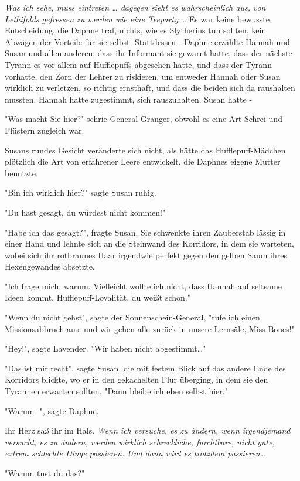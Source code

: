 {\emph{Was ich sehe, muss eintreten … dagegen sieht es wahrscheinlich aus, von Lethifolds gefressen zu werden wie eine Teeparty} … Es war keine bewusste Entscheidung, die Daphne traf, nichts, wie es Slytherins tun sollten, kein Abwägen der Vorteile für sie selbst. Stattdessen - Daphne erzählte Hannah und Susan und allen anderen, dass ihr Informant sie gewarnt hatte, dass der nächste Tyrann es vor allem auf Hufflepuffs abgesehen hatte, und dass der Tyrann vorhatte, den Zorn der Lehrer zu riskieren, um entweder Hannah oder Susan wirklich zu verletzen, so richtig ernsthaft, und dass die beiden sich da raushalten mussten. Hannah hatte zugestimmt, sich rauszuhalten. Susan hatte -

"Was macht Sie hier?" schrie General Granger, obwohl es eine Art Schrei und Flüstern zugleich war.

Susans rundes Gesicht veränderte sich nicht, als hätte das Hufflepuff-Mädchen plötzlich die Art von erfahrener Leere entwickelt, die Daphnes eigene Mutter benutzte.

"Bin ich wirklich hier?" sagte Susan ruhig.

"Du hast gesagt, du würdest nicht kommen!"

"Habe ich das gesagt?", fragte Susan. Sie schwenkte ihren Zauberstab lässig in einer Hand und lehnte sich an die Steinwand des Korridors, in dem sie warteten, wobei sich ihr rotbraunes Haar irgendwie perfekt gegen den gelben Saum ihres Hexengewandes absetzte.

"Ich frage mich, warum. Vielleicht wollte ich nicht, dass Hannah auf seltsame Ideen kommt. Hufflepuff-Loyalität, du weißt schon."

"Wenn du nicht gehst", sagte der Sonnenschein-General, "rufe ich einen Missionsabbruch aus, und wir gehen alle zurück in unsere Lernsäle, Miss Bones!"

"Hey!", sagte Lavender. "Wir haben nicht abgestimmt…"

"Das ist mir recht", sagte Susan, die mit festem Blick auf das andere Ende des Korridors blickte, wo er in den gekachelten Flur überging, in dem sie den Tyrannen erwarten sollten. "Dann bleibe ich eben selbst hier."

"Warum -", sagte Daphne.

Ihr Herz saß ihr im Hals. \emph{Wenn ich versuche, es zu ändern, wenn irgendjemand versucht, es zu ändern, werden wirklich schreckliche, furchtbare, nicht gute, extrem schlechte Dinge passieren. Und dann wird es trotzdem passieren…}

"Warum tust du das?"

}

